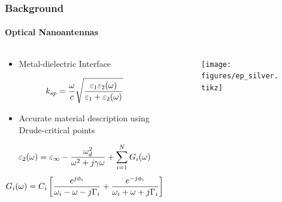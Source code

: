 \documentclass[mathserif,18pt,xcolor=table,c]{beamer}
\begin{document}
  \begin{frame}
    \frametitle{Background}
    \framesubtitle{Optical Nanoantennas}
    \begin{columns}[T] %
      \begin{column}{.5\textwidth}
        \begin{itemize}
          \item Metal-dielectric Interface
        \end{itemize}
        \begin{equation} \nonumber
          k_{sp}=\frac{\omega}{c}\sqrt {\dfrac {\varepsilon_{1}\varepsilon_{2}(\omega)} {\varepsilon_{1} + \varepsilon_{2}(\omega)}}
          \label{eq:dis_spp}
        \end{equation}
        \begin{itemize}
          \item Accurate material description using Drude-critical points
        \end{itemize}
        \begin{equation} \nonumber
          \varepsilon_2(\omega) = \varepsilon_{\infty} - \frac{\omega_{d}^{2}}{\omega^2 + j\gamma \omega} + \sum \limits_{i = 1}^N G_i(\omega)
          \label{eq:eps_drude_cp}
        \end{equation}
        \begin{equation} \nonumber
          G_i(\omega) = C_i \left[ \frac{e^{j \phi_i}}{\omega_i - \omega - j \Gamma_i} + \frac{e^{-j \phi_i}}{\omega_i + \omega + j \Gamma_i} \right]
          \label{eq:CP_terms}
        \end{equation}
      \end{column}
      \begin{column}[T]{.5\textwidth}
        \centering
          \begin{figure}
            \vspace*{-2cm}
            \texttt{[image: figures/ep\_silver.tikz]}
            \label{fig:ep_silver}
          \end{figure}
          \begin{figure}
            \vspace*{-.3cm}

\end{figure}
\end{column}
\end{columns}
\end{frame}
\end{document}

